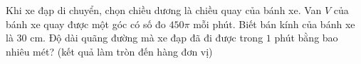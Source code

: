 \begin{ex}
Khi xe đạp di chuyển, chọn chiều dương là chiều quay của bánh xe. Van $V$ của bánh xe quay được một góc có số đo $450\pi$ mỗi phút. Biết bán kính của bánh xe là $30$ cm. Độ dài quãng đường mà xe đạp đã đi được trong $1$ phút bằng bao nhiêu mét? (kết quả làm tròn đến hàng đơn vị)
\end{ex}
